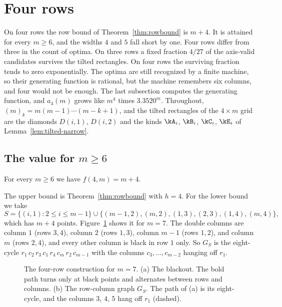 \section{Four rows}\label{sec:four}

On four rows the row bound of Theorem~\ref{thm:rowbound} is $m+4$. It is attained for every $m\ge6$, and the widths $4$ and $5$ fall short by one. Four rows differ from three in the count of optima. On three rows a fixed fraction $4/27$ of the axis-valid candidates survives the tilted rectangles. On four rows the surviving fraction tends to zero exponentially. The optima are still recognized by a finite machine, so their generating function is rational, but the machine remembers six columns, and four would not be enough. The last subsection computes the generating function, and $a_4(m)$ grows like $m^4$ times $3.3520^m$. Throughout, $(m)_k=m(m-1)\cdots(m-k+1)$, and the tilted rectangles of the $4\times m$ grid are the diamonds $D(i,1)$, $D(i,2)$ and the kinds $\kA_i$, $\kB_i$, $\kC_i$, $\kE_i$ of Lemma~\ref{lem:tilted-narrow}.

\subsection{The value for \texorpdfstring{$m\ge6$}{m at least 6}}

\begin{theorem}\label{thm:fourvalue}
For every $m\ge6$ we have $f(4,m)=m+4$.
\end{theorem}

The upper bound is Theorem~\ref{thm:rowbound} with $h=4$. For the lower bound we take
\begin{equation}\label{eq:fourS}
S=\{(i,1):2\le i\le m-1\}\cup\{(m-1,2),(m,2),(1,3),(2,3),(1,4),(m,4)\},
\end{equation}
which has $m+4$ points. Figure~\ref{fig:four} shows it for $m=7$. The double columns are column $1$ (rows $3,4$), column $2$ (rows $1,3$), column $m-1$ (rows $1,2$), and column $m$ (rows $2,4$), and every other column is black in row $1$ only. So $G_S$ is the eight-cycle $r_1\,c_2\,r_3\,c_1\,r_4\,c_m\,r_2\,c_{m-1}$ with the columns $c_3,\ldots,c_{m-2}$ hanging off $r_1$.

\begin{figure}[t]
\centering

\caption{The four-row construction for $m=7$. (a) The blackout. The bold path turns only at black points and alternates between rows and columns. (b) The row-column graph $G_S$. The path of (a) is its eight-cycle, and the columns $3$, $4$, $5$ hang off $r_1$ (dashed).}
\label{fig:four}
\end{figure}


